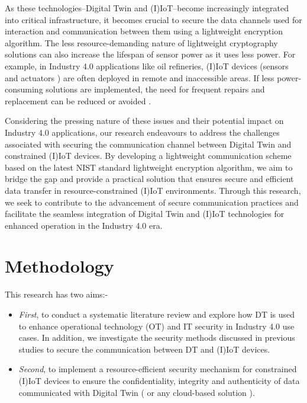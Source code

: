 As these technologies--Digital Twin and (I)IoT--become increasingly integrated into critical infrastructure, it becomes crucial to secure the data channels used for interaction and communication between them using a lightweight encryption algorithm. The less resource-demanding nature of lightweight cryptography solutions can also increase the lifespan of sensor power as it uses less power. For example, in Industry 4.0 applications like oil refineries, (I)IoT devices (sensors and actuators ) are often deployed in remote and inaccessible areas. If less power-consuming solutions are implemented, the need for frequent repairs and replacement can be reduced or avoided \cite{williams_survey_2022, noauthor_lightweight_nodate}.


Considering the pressing nature of these issues and their potential impact on Industry 4.0 applications, our research endeavours to address the challenges associated with securing the communication channel between Digital Twin and constrained (I)IoT devices. By developing a lightweight communication scheme based on the latest NIST standard lightweight encryption algorithm, we aim to bridge the gap and provide a practical solution that ensures secure and efficient data transfer in resource-constrained (I)IoT environments. Through this research, we seek to contribute to the advancement of secure communication practices and facilitate the seamless integration of Digital Twin and (I)IoT technologies for enhanced operation in the Industry 4.0 era.



\section{Methodology}
This research has two aims:-
\begin{itemize}
    \item \textit{First}, to conduct a systematic literature review and explore how DT is used to enhance operational technology (OT) and IT security in Industry 4.0 use cases. In addition, we investigate the security methods discussed in previous studies to secure the communication between DT and (I)IoT devices.

    \item \textit{Second}, to implement a resource-efficient security mechanism for constrained (I)IoT devices to ensure the confidentiality, integrity and authenticity of data communicated with Digital Twin ( or any cloud-based solution ). 
\end{itemize}

